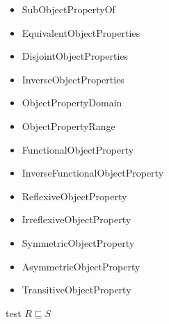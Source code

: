 \documentclass[paper.tex]{subfiles}
\begin{document}
\begin{itemize}[noitemsep]
  \ttfamily
  \item SubObjectPropertyOf
  \item EquivalentObjectProperties
  \item DisjointObjectProperties
  \item InverseObjectProperties
  \item ObjectPropertyDomain
  \item ObjectPropertyRange
  \item FunctionalObjectProperty
  \item InverseFunctionalObjectProperty
  \item ReflexiveObjectProperty
  \item IrreflexiveObjectProperty
  \item SymmetricObjectProperty
  \item AsymmetricObjectProperty
  \item TransitiveObjectProperty
\end{itemize}

\begin{algorithm}[H]
  \caption{test $R \sqsubseteq S$}
  \begin{algorithmic}[1]
      \State \todo
    \EndFunction
  \end{algorithmic}
\end{algorithm}

\end{document}

